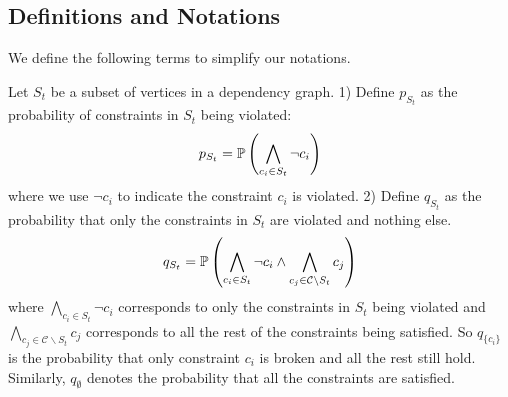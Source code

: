 \subsection{Definitions and Notations}
We define the following terms to simplify our notations.
\begin{definition}  \label{def:p_q_st}
    Let $S_t$ be a subset of vertices in a dependency graph.
    1) Define $p_{S_t}$ as the probability of  constraints in $S_t$ being violated:
    \begin{equation} \label{eq:def-pst}
        p_{S_t}=\mathbb{P}\left(\bigwedge_{c_i \in S_t}\neg{c}_i \right)
    \end{equation}
    {where we use $\neg{c}_i $ to indicate the constraint $c_i$ is violated.}
    2) Define $q_{S_t}$ as the probability that only the constraints in $S_t$ are violated and nothing else.
    \begin{equation} \label{eq:definition-qst}
        q_{S_t}=\mathbb{P}\left(\bigwedge_{c_i \in S_t}\neg{c}_i \wedge \bigwedge_{c_j \in \mathcal{C}\backslash S_t}c_j\right)
    \end{equation}
    {where $\bigwedge_{c_i \in S_t}\neg{c}_i $ corresponds to only the constraints in $S_t$ being violated and $\bigwedge_{c_j \in \mathcal{C}\backslash S_t}c_j$ corresponds to all the rest of the constraints being satisfied.}
    So $q_{\{c_i\}}$ is the probability that only constraint $c_i$ is broken and all the rest still  hold. Similarly, $q_{\emptyset}$ denotes the probability that all the constraints are satisfied.
\end{definition}


